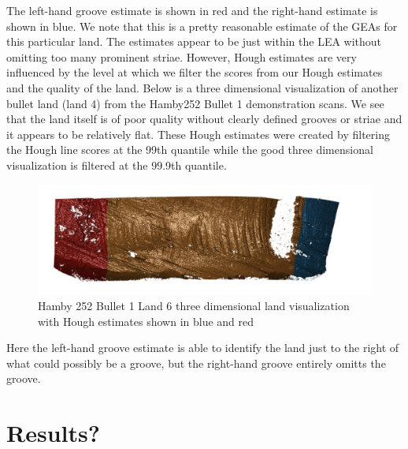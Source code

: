 \documentclass[12pt]{article}
\theoremstyle{nonumberplain}
\begin{document}
The left-hand groove estimate is shown in red and the right-hand estimate is shown in blue. We note that this is a pretty reasonable estimate of the GEAs for this particular land. The estimates appear to be just within the LEA without omitting too many prominent striae. However, Hough estimates are very influenced by the level at which we filter the scores from our Hough estimates and the quality of the land. Below is a three dimensional visualization of another bullet land (land 4) from the Hamby252 Bullet 1 demonstration scans. We see that the land itself is of poor quality without clearly defined grooves or striae and it appears to be relatively flat. These Hough estimates were created by filtering the Hough line scores at the 99th quantile while the good three dimensional visualization is filtered at the 99.9th quantile. 

\begin{figure}[!ht]
  \centering
  \includegraphics[width = .7\textwidth]{../images/Hamby252_Bullet1_Land6_BadMask}
  \caption{Hamby 252 Bullet 1 Land 6 three dimensional land visualization with Hough estimates shown in blue and red}
\end{figure}

Here the left-hand  groove estimate is able to identify the land just to the right of what could possibly be a groove, but the right-hand groove entirely omitts the groove. 


\section{Results?}




 
\end{document}
